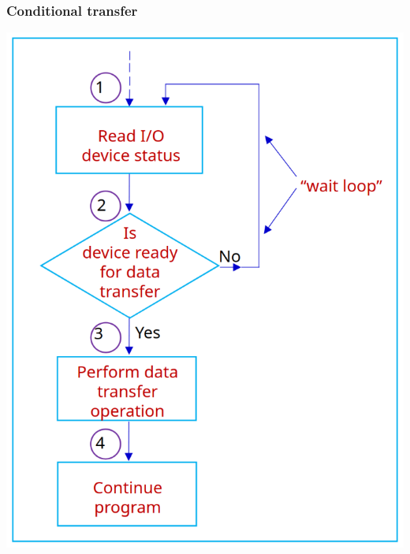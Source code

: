 \documentclass[11pt]{article}
\begin{document}
\subsubsection{Conditional transfer}
\label{sec:orgec47615}

\begin{center}
\includegraphics[scale=0.55]{./images/conditional-transfer-process-diagram.png}
\end{center}
\end{document}
